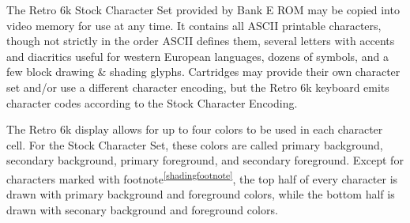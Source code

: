 \documentclass[12pt]{{memoir}}
\begin{document}
The Retro 6k Stock Character Set provided by Bank E ROM may be copied into video memory for use at any time. It contains all ASCII printable characters, though not strictly in the order ASCII defines them, several letters with accents and diacritics useful for western European languages, dozens of symbols, and a few block drawing \& shading glyphs. Cartridges may provide their own character set and/or use a different character encoding, but the Retro 6k keyboard emits character codes according to the Stock Character Encoding.

The Retro 6k display allows for up to four colors to be used in each character cell. For the Stock Character Set, these colors are called primary background, secondary background, primary foreground, and secondary foreground. Except for characters marked with footnote\textsuperscript{\ref{shadingfootnote}}, the top half of every character is drawn with primary background and foreground colors, while the bottom half is drawn with seconary background and foreground colors.
\end{document}
